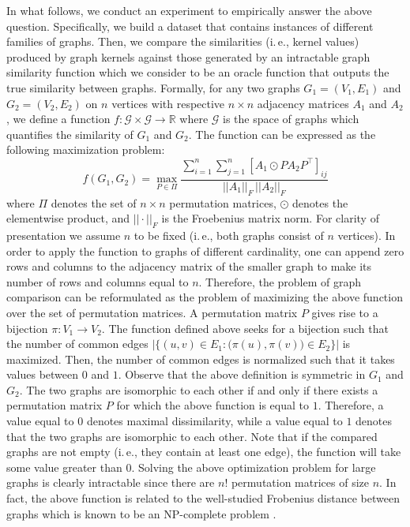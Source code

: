 \documentclass[twoside,11pt]{article}
\newcommand{\ie}{i.\,e., }
\begin{document}
In what follows, we conduct an experiment to empirically answer the above question.
Specifically, we build a dataset that contains instances of different families of graphs.
Then, we compare the similarities (\ie kernel values) produced by graph kernels against those generated by an intractable graph similarity function which we consider to be an oracle function that outputs the true similarity between graphs.
Formally, for any two graphs $G_1 = (V_1, E_1)$ and $G_2 = (V_2, E_2)$ on $n$ vertices with respective $n \times n$ adjacency matrices $A_1$ and $A_2$, we define a function $f : \mathcal{G} \times \mathcal{G} \rightarrow \mathbb{R}$ where $\mathcal{G}$ is the space of graphs which quantifies the similarity of $G_1$ and $G_2$.
The function can be expressed as the following maximization problem:
\begin{equation}
    f(G_1, G_2) = \max_{P \in \Pi} \frac{\sum_{i=1}^n \sum_{j=1}^n \left[ A_1 \odot P A_2 P^\top \right]_{ij}}{||A_1||_F \, ||A_2||_F}
    \label{eq:sim_function}
\end{equation}
where $\Pi$ denotes the set of $n \times n$ permutation matrices, $\odot$ denotes the elementwise product, and $||\cdot||_F$ is the Froebenius matrix norm.
For clarity of presentation we assume $n$ to be fixed (\ie both graphs consist of $n$ vertices).
In order to apply the function to graphs of different cardinality, one can append zero rows and columns to the adjacency matrix of the smaller graph to make its number of rows and columns equal to $n$.
Therefore, the problem of graph comparison can be reformulated as the problem of maximizing the above function over the set of permutation matrices.
A permutation matrix $P$ gives rise to a bijection $\pi : V_1 \rightarrow V_2$.
The function defined above seeks for a bijection such that the number of common edges $|\{ (u,v) \in E_1 : \big(\pi(u),\pi(v)\big) \in E_2 \}|$ is maximized.
Then, the number of common edges is normalized such that it takes values between $0$ and $1$.
Observe that the above definition is symmetric in $G_1$ and $G_2$.
The two graphs are isomorphic to each other if and only if there exists a permutation matrix $P$ for which the above function is equal to $1$.
Therefore, a value equal to $0$ denotes maximal dissimilarity, while a value equal to $1$ denotes that the two graphs are isomorphic to each other.
Note that if the compared graphs are not empty (\ie they contain at least one edge), the function will take some value greater than $0$.
Solving the above optimization problem for large graphs is clearly intractable since there are $n!$ permutation matrices of size $n$.
In fact, the above function is related to the well-studied Frobenius distance between graphs which is known to be an NP-complete problem .
\end{document}

